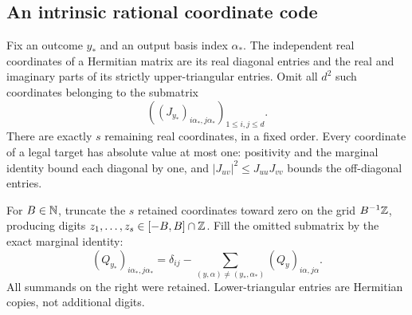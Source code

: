 \subsection{An intrinsic rational coordinate code}
Fix an outcome $y_*$ and an output basis index $\alpha_*$. The
independent real coordinates of a Hermitian matrix are its real diagonal
entries and the real and imaginary parts of its strictly upper-triangular
entries. Omit all $d^2$ such coordinates belonging to the submatrix
\[
 ((J_{y_*})_{i\alpha_*,j\alpha_*})_{1\le i,j\le d}.
\]
There are exactly $s$ remaining real coordinates, in a fixed order.
Every coordinate of a legal target has absolute value at most one:
positivity and the marginal identity bound each diagonal by one, and
$|J_{uv}|^2\le J_{uu}J_{vv}$ bounds the off-diagonal entries.

For $B\in\mathbb N$, truncate the $s$ retained coordinates toward zero on
the grid $B^{-1}\mathbb Z$, producing digits $z_1,\ldots,z_s\in[-B,B]\cap\mathbb Z$.
Fill the omitted submatrix by the exact marginal identity:
\begin{equation}\label{eq:intrinsicfill67}
 (Q_{y_*})_{i\alpha_*,j\alpha_*}
 =\delta_{ij}-
   \sum_{(y,\alpha)\ne(y_*,\alpha_*)}
                         (Q_y)_{i\alpha,j\alpha}.
\end{equation}
All summands on the right were retained. Lower-triangular entries are
Hermitian copies, not additional digits.

